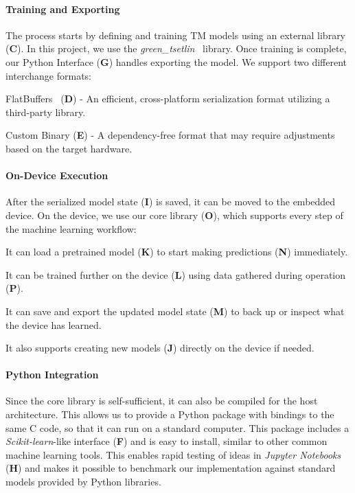 \documentclass[english]{aghengthesis} %
\newcommand*{\GreenTsetlinName}{\emph{green\_tsetlin}~\cite{glimsdal2024greentsetlin} }
\begin{document}
\paragraph{Training and Exporting}
The process starts by defining and training TM models using an external library (\textbf{C}). In this project, we use the \GreenTsetlinName library. Once training is complete, our Python Interface (\textbf{G}) handles exporting the model. We support two different interchange formats:
\begin{compactitem}
    \item FlatBuffers~\cite{flatbuffers} (\textbf{D}) - An efficient, cross-platform serialization format utilizing a third-party library.
    \item Custom Binary (\textbf{E}) - A dependency-free format that may require adjustments based on the target hardware.
\end{compactitem}

\paragraph{On-Device Execution}
After the serialized model state (\textbf{I}) is saved, it can be moved to the embedded device. On the device, we use our core library (\textbf{O}), which supports every step of the machine learning workflow:
\begin{compactitem}
    \item It can load a pretrained model (\textbf{K}) to start making predictions (\textbf{N}) immediately.
    \item It can be trained further on the device (\textbf{L}) using data gathered during operation (\textbf{P}).
    \item It can save and export the updated model state (\textbf{M}) to back up or inspect what the device has learned.
    \item It also supports creating new models (\textbf{J}) directly on the device if needed.
\end{compactitem}

\paragraph{Python Integration}
Since the core library is self-sufficient, it can also be compiled for the host architecture. This allows us to provide a Python package with bindings to the same C code, so that it can run on a standard computer. This package includes a \textit{Scikit-learn}-like interface (\textbf{F}) and is easy to install, similar to other common machine learning tools. This enables rapid testing of ideas in \textit{Jupyter Notebooks} (\textbf{H}) and makes it possible to benchmark our implementation against standard models provided by Python libraries.
\end{document}

